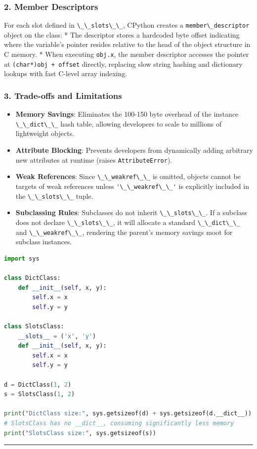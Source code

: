 \hypertarget{member-descriptors}{%
\subsubsection{2. Member Descriptors}\label{member-descriptors}}

For each slot defined in \passthrough{\lstinline!\_\_slots\_\_!},
CPython creates a \passthrough{\lstinline!member\_descriptor!} object on
the class: * The descriptor stores a hardcoded byte offset indicating
where the variable's pointer resides relative to the head of the object
structure in C memory. * When executing \passthrough{\lstinline!obj.x!},
the member descriptor accesses the pointer at
\passthrough{\lstinline!(char*)obj + offset!} directly, replacing slow
string hashing and dictionary lookups with fast C-level array indexing.

\hypertarget{trade-offs-and-limitations}{%
\subsubsection{3. Trade-offs and
Limitations}\label{trade-offs-and-limitations}}

\begin{itemize}
\tightlist
\item
  \textbf{Memory Savings}: Eliminates the 100-150 byte overhead of the
  instance \passthrough{\lstinline!\_\_dict\_\_!} hash table, allowing
  developers to scale to millions of lightweight objects.
\item
  \textbf{Attribute Blocking}: Prevents developers from dynamically
  adding arbitrary new attributes at runtime (raises
  \passthrough{\lstinline!AttributeError!}).
\item
  \textbf{Weak References}: Since
  \passthrough{\lstinline!\_\_weakref\_\_!} is omitted, objects cannot
  be targets of weak references unless
  \passthrough{\lstinline!'\_\_weakref\_\_'!} is explicitly included in
  the \passthrough{\lstinline!\_\_slots\_\_!} tuple.
\item
  \textbf{Subclassing Rules}: Subclasses do not inherit
  \passthrough{\lstinline!\_\_slots\_\_!}. If a subclass does not
  declare \passthrough{\lstinline!\_\_slots\_\_!}, it will allocate a
  standard \passthrough{\lstinline!\_\_dict\_\_!} and
  \passthrough{\lstinline!\_\_weakref\_\_!}, rendering the parent's
  memory savings moot for subclass instances.
\end{itemize}

\begin{lstlisting}[language=Python]
import sys

class DictClass:
    def __init__(self, x, y):
        self.x = x
        self.y = y

class SlotsClass:
    __slots__ = ('x', 'y')
    def __init__(self, x, y):
        self.x = x
        self.y = y

d = DictClass(1, 2)
s = SlotsClass(1, 2)

print("DictClass size:", sys.getsizeof(d) + sys.getsizeof(d.__dict__))
# SlotsClass has no __dict__, consuming significantly less memory
print("SlotsClass size:", sys.getsizeof(s))
\end{lstlisting}

\begin{center}\rule{0.5\linewidth}{0.5pt}\end{center}
